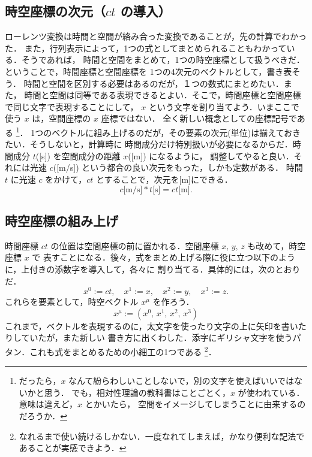     \subsection{時空座標の次元（$ct$ の導入）}\label{cap:ct_jikuu}
        ローレンツ変換は時間と空間が絡み合った変換であることが，先の計算でわかった．
        また，行列表示によって，1つの式としてまとめられることもわかっている．そうであれば，
        時間と空間をまとめて，1つの時空座標として扱うべきだ．ということで，時間座標と空間座標を
        1つの4次元のベクトルとして，書き表そう．
        時間と空間を区別する必要はあるのだが，１つの数式にまとめたい．また，
        時間と空間は同等である表現できるとよい．そこで，時間座標と空間座標で同じ文字で表現することにして，
        $x$ という文字を割り当てよう．いまここで使う $x$ は，空間座標の $x$ 座標ではない．
        全く新しい概念としての座標記号である
            \footnote{
                だったら，$x$ なんて紛らわしいことしないで，別の文字を使えばいいではないかと思う．
                でも，相対性理論の教科書はことごとく，$x$ が使われている．意味は違えど，$x$ とかいたら，
                空間をイメージしてしまうことに由来するのだろうか．
            }．
        1つのベクトルに組み上げるのだが，その要素の次元(単位)は揃えておきたい．そうしないと，計算時に
        時間成分だけ特別扱いが必要になるからだ．時間成分 $t$([s]) を空間成分の距離 $x$([m]) になるように，
        調整してやると良い．それには光速 $c$([m/s]) という都合の良い次元をもった，しかも定数がある．
        時間 $t$ に光速 $c$ をかけて，$ct$ とすることで，次元を[m]にできる．
        \[
            c\mbox{[m/s]} * t\mbox{[s]} = ct\mbox{[m]}.
        \]

    \subsection{時空座標の組み上げ}
        時間座標 $ct$ の位置は空間座標の前に置かれる．空間座標 $x,\, y,\, z$ も改めて，時空座標 $x$ で
        表すことになる．後々，式をまとめ上げる際に役に立つ以下のように，上付きの添数字を導入して，各々に
        割り当てる．具体的には，次のとおりだ．
        \[
            x^{0} := ct, \quad x^{1} := x, \quad x^{2} := y, \quad x^{3} := z.
        \]
        これらを要素として，時空ベクトル $x^{\mu}$ を作ろう．
        \[
            x^{\mu} := \left( x^{0}, \, x^{1}, \, x^{2}, \, x^{3} \right)
        \]
        これまで，ベクトルを表現するのに，太文字を使ったり文字の上に矢印を書いたりしていたが，また新しい
        書き方に出くわした．添字にギリシャ文字を使うパタン．これも式をまとめるための小細工の1つである
            \footnote{
                なれるまで使い続けるしかない．一度なれてしまえば，かなり便利な記法であることが実感できよう．
            }．

